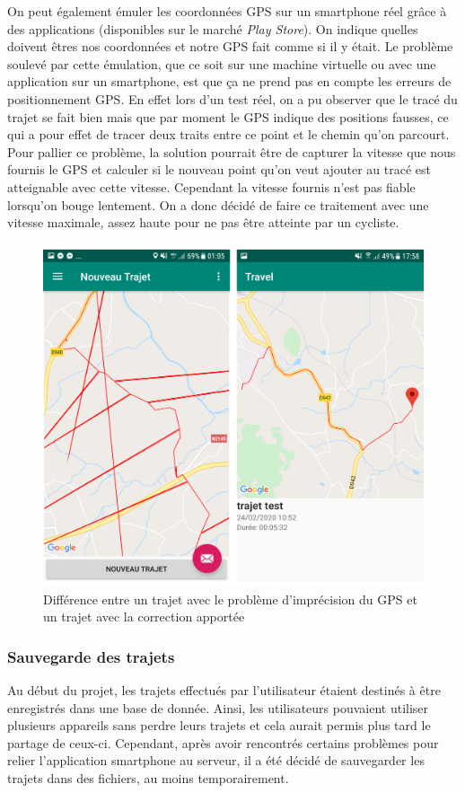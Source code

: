 On peut également émuler les coordonnées GPS sur un smartphone réel grâce à des applications (disponibles sur le marché \emph{Play Store}).
On indique quelles doivent êtres nos coordonnées et notre GPS fait comme si il y était. Le problème soulevé par cette émulation, que ce soit
sur une machine virtuelle ou avec une application sur un smartphone, est que ça ne prend pas en compte les erreurs de positionnement GPS.
En effet lors d'un test réel, on a pu observer que le tracé du trajet se fait bien mais que par moment le GPS indique des positions fausses,
ce qui a pour effet de tracer deux traits entre ce point et le chemin qu'on parcourt. Pour pallier ce problème, la solution pourrait être
de capturer la vitesse que nous fournis le GPS et calculer si le nouveau point qu'on veut ajouter au tracé est atteignable avec cette vitesse.
Cependant la vitesse fournis n'est pas fiable lorsqu'on bouge lentement. On a donc décidé de faire ce traitement avec une vitesse maximale,
assez haute pour ne pas être atteinte par un cycliste.
\begin{figure}[ht]
    \label{Différence entre avant et après correction}
    \centering
    \includegraphics[scale=0.6]{images/avant-apres.png}
    \caption{Différence entre un trajet avec le problème d'imprécision du GPS et un trajet avec la correction apportée}
\end{figure}

\subsubsection{Sauvegarde des trajets}
Au début du projet, les trajets effectués par l'utilisateur étaient destinés à être enregistrés dans une base de donnée. Ainsi, les utilisateurs
pouvaient utiliser plusieurs appareils sans perdre leurs trajets et cela aurait permis plus tard le partage de ceux-ci. Cependant, après avoir
rencontrés certains problèmes pour relier l'application smartphone au serveur, il a été décidé de sauvegarder les trajets dans des fichiers,
au moins temporairement.

